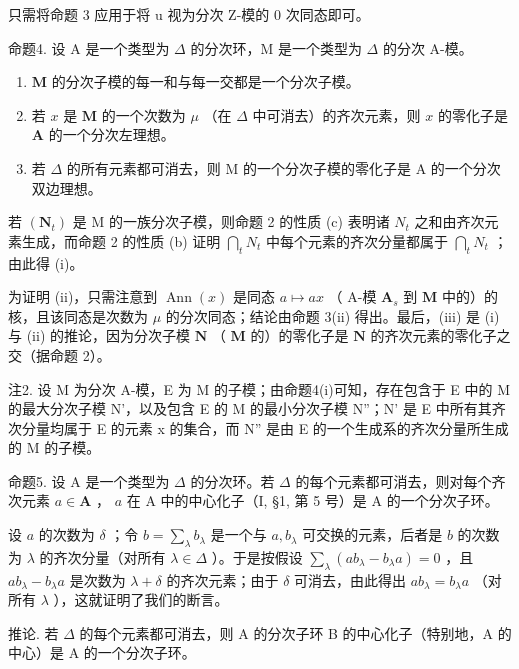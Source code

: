 只需将命题 3 应用于将 u 视为分次 Z-模的 0 次同态即可。

命题4. 设 A 是一个类型为 \(\Delta\) 的分次环，M 是一个类型为 \(\Delta\) 的分次 A-模。

\begin{enumerate}
\def\labelenumi{(\roman{enumi})}
\item
  \(\mathbf{M}\) 的分次子模的每一和与每一交都是一个分次子模。
\item
  若 \(x\) 是 \(\mathbf{M}\) 的一个次数为 \(\mu\) （在 \(\Delta\) 中可消去）的齐次元素，则 \(x\) 的零化子是 \(\mathbf{A}\) 的一个分次左理想。
\item
  若 \(\Delta\) 的所有元素都可消去，则 M 的一个分次子模的零化子是 A 的一个分次双边理想。
\end{enumerate}

若 \((\mathbf{N}_{t})\) 是 M 的一族分次子模，则命题 2 的性质 (c) 表明诸 \(N_{t}\) 之和由齐次元素生成，而命题 2 的性质 (b) 证明 \(\bigcap_{t} N_{t}\) 中每个元素的齐次分量都属于 \(\bigcap_{t} N_{t}\) ；由此得 (i)。

为证明 (ii)，只需注意到 \(\operatorname{Ann}(x)\) 是同态 \(a \mapsto ax\) （ A-模 \(\mathbf{A}_s\) 到 \(\mathbf{M}\) 中的）的核，且该同态是次数为 \(\mu\) 的分次同态；结论由命题 3(ii) 得出。最后，(iii) 是 (i) 与 (ii) 的推论，因为分次子模 \(\mathbf{N}\) （ \(\mathbf{M}\) 的）的零化子是 \(\mathbf{N}\) 的齐次元素的零化子之交（据命题 2）。

注2. 设 M 为分次 A-模，E 为 M 的子模；由命题4(i)可知，存在包含于 E 中的 M 的最大分次子模 N'，以及包含 E 的 M 的最小分次子模 N''；N' 是 E 中所有其齐次分量均属于 E 的元素 x 的集合，而 N'' 是由 E 的一个生成系的齐次分量所生成的 M 的子模。

命题5. 设 A 是一个类型为 \(\Delta\) 的分次环。若 \(\Delta\) 的每个元素都可消去，则对每个齐次元素 \(a \in \mathbf{A}\) ， \(a\) 在 A 中的中心化子（I, §1, 第 5 号）是 A 的一个分次子环。

设 \(a\) 的次数为 \(\delta\) ；令 \(b = \sum_{\lambda} b_{\lambda}\) 是一个与 \(a, b_{\lambda}\) 可交换的元素，后者是 \(b\) 的次数为 \(\lambda\) 的齐次分量（对所有 \(\lambda \in \Delta\) ）。于是按假设 \(\sum_{\lambda} (ab_{\lambda} - b_{\lambda}a) = 0\) ，且 \(ab_{\lambda} - b_{\lambda}a\) 是次数为 \(\lambda + \delta\) 的齐次元素；由于 \(\delta\) 可消去，由此得出 \(ab_{\lambda} = b_{\lambda}a\) （对所有 \(\lambda\) ），这就证明了我们的断言。

推论. 若 \(\Delta\) 的每个元素都可消去，则 A 的分次子环 B 的中心化子（特别地，A 的中心）是 A 的一个分次子环。

